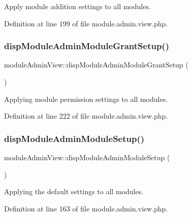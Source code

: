 Apply module addition settings to all modules. 



Definition at line 199 of file module.\+admin.\+view.\+php.

\hypertarget{classmoduleAdminView_a132b98243602c81f583f4746a04628d7}{}\label{classmoduleAdminView_a132b98243602c81f583f4746a04628d7} 
\subsubsection{\texorpdfstring{disp\+Module\+Admin\+Module\+Grant\+Setup()}{dispModuleAdminModuleGrantSetup()}}
{\footnotesize\ttfamily module\+Admin\+View\+::disp\+Module\+Admin\+Module\+Grant\+Setup (\begin{DoxyParamCaption}{ }\end{DoxyParamCaption})}



Applying module permission settings to all modules. 



Definition at line 222 of file module.\+admin.\+view.\+php.

\hypertarget{classmoduleAdminView_a3af1bd27e1da3bc8e31815d109a476da}{}\label{classmoduleAdminView_a3af1bd27e1da3bc8e31815d109a476da} 
\subsubsection{\texorpdfstring{disp\+Module\+Admin\+Module\+Setup()}{dispModuleAdminModuleSetup()}}
{\footnotesize\ttfamily module\+Admin\+View\+::disp\+Module\+Admin\+Module\+Setup (\begin{DoxyParamCaption}{ }\end{DoxyParamCaption})}



Applying the default settings to all modules. 



Definition at line 163 of file module.\+admin.\+view.\+php.

